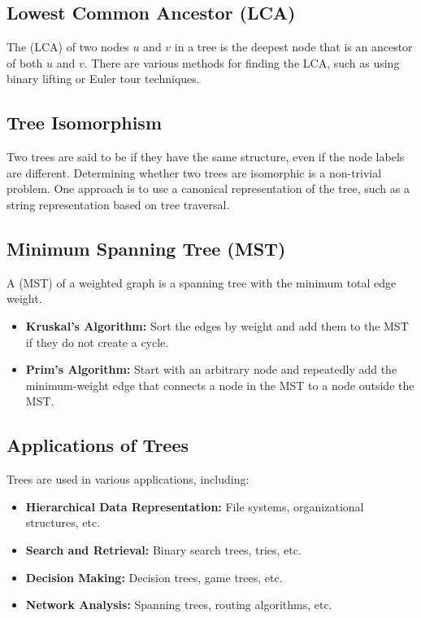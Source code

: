\subsection{Lowest Common Ancestor (LCA)}
The  (LCA) of two nodes $u$ and $v$ in a tree is the deepest node that is an ancestor of both $u$ and $v$.
There are various methods for finding the LCA, such as using binary lifting or Euler tour techniques.

\subsection{Tree Isomorphism}
Two trees are said to be  if they have the same structure, even if the node labels are different.
Determining whether two trees are isomorphic is a non-trivial problem.
One approach is to use a canonical representation of the tree, such as a string representation based on tree traversal.

\subsection{Minimum Spanning Tree (MST)}
A  (MST) of a weighted graph is a spanning tree with the minimum total edge weight.
\begin{itemize}
    \item \textbf{Kruskal's Algorithm:} Sort the edges by weight and add them to the MST if they do not create a cycle.
    \item \textbf{Prim's Algorithm:} Start with an arbitrary node and repeatedly add the minimum-weight edge that connects a node in the MST to a node outside the MST.
\end{itemize}
\subsection{Applications of Trees}
Trees are used in various applications, including:
\begin{itemize}
    \item \textbf{Hierarchical Data Representation:} File systems, organizational structures, etc.
    \item \textbf{Search and Retrieval:} Binary search trees, tries, etc.
    \item \textbf{Decision Making:} Decision trees, game trees, etc.
    \item \textbf{Network Analysis:} Spanning trees, routing algorithms, etc.
\end{itemize}
